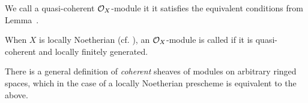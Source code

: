 \documentclass[a4paper,parskip=half,numbers=enddot, DIV=12]{scrreprt}
\begin{document}
\begin{defi}
	\begin{alphanumerate}
		\item We call a quasi-coherent $\mathcal{O}_X$-module  it it satisfies the equivalent conditions from Lemma~.
		\item When $X$ is locally Noetherian (cf. \cite[Definition~2.2.2]{alggeo1}), an $\mathcal{O}_X$-module is called  if it is quasi-coherent and locally finitely generated.
	\end{alphanumerate}
\end{defi}
\begin{rem*}
	There is a general definition of \emph{coherent} sheaves of modules on arbitrary ringed spaces, which in the case of a locally Noetherian prescheme is equivalent to the above.
\end{rem*}
\end{document}
